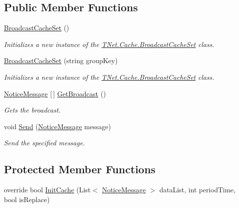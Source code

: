 \subsection*{Public Member Functions}
\begin{DoxyCompactItemize}
\item 
\mbox{\hyperlink{class_t_net_1_1_cache_1_1_broadcast_cache_set_a80ce93600307c2aeec24fb35c09c3e54}{Broadcast\+Cache\+Set}} ()
\begin{DoxyCompactList}\small\item\em Initializes a new instance of the \mbox{\hyperlink{class_t_net_1_1_cache_1_1_broadcast_cache_set}{T\+Net.\+Cache.\+Broadcast\+Cache\+Set}} class. \end{DoxyCompactList}\item 
\mbox{\hyperlink{class_t_net_1_1_cache_1_1_broadcast_cache_set_abc56c5e081a7cbd02ca29b502a264c1a}{Broadcast\+Cache\+Set}} (string group\+Key)
\begin{DoxyCompactList}\small\item\em Initializes a new instance of the \mbox{\hyperlink{class_t_net_1_1_cache_1_1_broadcast_cache_set}{T\+Net.\+Cache.\+Broadcast\+Cache\+Set}} class. \end{DoxyCompactList}\item 
\mbox{\hyperlink{class_t_net_1_1_message_1_1_notice_message}{Notice\+Message}} \mbox{[}$\,$\mbox{]} \mbox{\hyperlink{class_t_net_1_1_cache_1_1_broadcast_cache_set_a10d801f1dec26e2b94647299014dd9a1}{Get\+Broadcast}} ()
\begin{DoxyCompactList}\small\item\em Gets the broadcast. \end{DoxyCompactList}\item 
void \mbox{\hyperlink{class_t_net_1_1_cache_1_1_broadcast_cache_set_a074d01ffe6317fbdc7ae60fd16d17045}{Send}} (\mbox{\hyperlink{class_t_net_1_1_message_1_1_notice_message}{Notice\+Message}} message)
\begin{DoxyCompactList}\small\item\em Send the specified message. \end{DoxyCompactList}\end{DoxyCompactItemize}
\subsection*{Protected Member Functions}
\begin{DoxyCompactItemize}
\item 
override bool \mbox{\hyperlink{class_t_net_1_1_cache_1_1_broadcast_cache_set_ab9fe3d2e0e4ddd44f86355831301cc84}{Init\+Cache}} (List$<$ \mbox{\hyperlink{class_t_net_1_1_message_1_1_notice_message}{Notice\+Message}} $>$ data\+List, int period\+Time, bool is\+Replace)
\end{DoxyCompactItemize}


